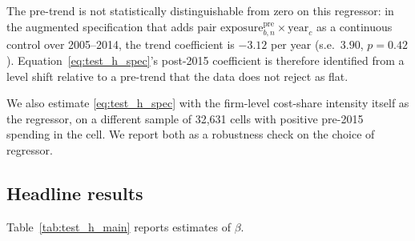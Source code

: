 The pre-trend is not statistically distinguishable from zero on this regressor: in the augmented specification that adds $\text{pair exposure}_{b,n}^{\text{pre}} \times \text{year}_c$ as a continuous control over 2005--2014, the trend coefficient is $-3.12$ per year (s.e.\ $3.90$, $p = 0.42$). Equation~\eqref{eq:test_h_spec}'s post-2015 coefficient is therefore identified from a level shift relative to a pre-trend that the data does not reject as flat.

We also estimate \eqref{eq:test_h_spec} with the firm-level cost-share intensity itself as the regressor, on a different sample of 32{,}631 cells with positive pre-2015 spending in the cell. We report both as a robustness check on the choice of regressor.

\subsection{Headline results}

Table~\ref{tab:test_h_main} reports estimates of $\beta$.

